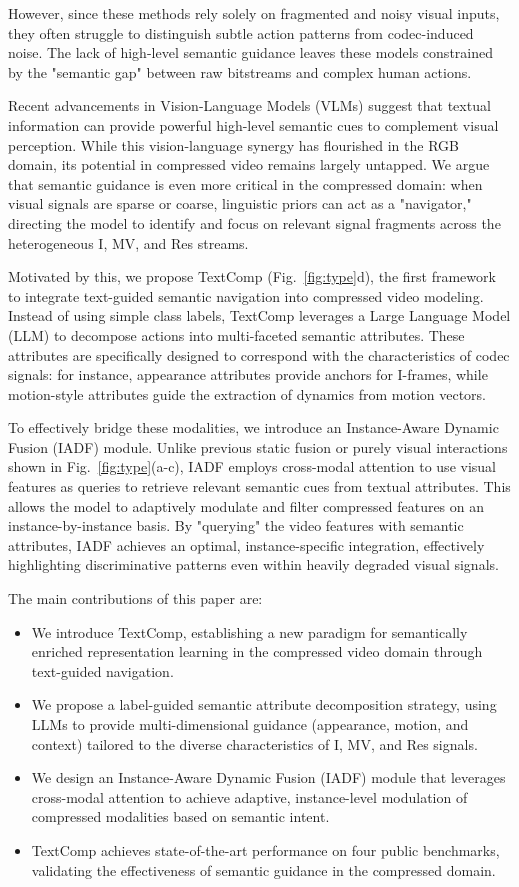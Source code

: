 \documentclass[letterpaper]{article} %
\begin{document}
However, since these methods rely solely on fragmented and noisy visual inputs, they often struggle to distinguish subtle action patterns from codec-induced noise. The lack of high-level semantic guidance leaves these models constrained by the "semantic gap" between raw bitstreams and complex human actions.

Recent advancements in Vision-Language Models (VLMs) suggest that textual information can provide powerful high-level semantic cues to complement visual perception. While this vision-language synergy has flourished in the RGB domain, its potential in compressed video remains largely untapped. We argue that semantic guidance is even more critical in the compressed domain: when visual signals are sparse or coarse, linguistic priors can act as a "navigator," directing the model to identify and focus on relevant signal fragments across the heterogeneous I, MV, and Res streams.

Motivated by this, we propose TextComp (Fig.~\ref{fig:type}d), the first framework to integrate text-guided semantic navigation into compressed video modeling. Instead of using simple class labels, TextComp leverages a Large Language Model (LLM) to decompose actions into multi-faceted semantic attributes. These attributes are specifically designed to correspond with the characteristics of codec signals: for instance, appearance attributes provide anchors for I-frames, while motion-style attributes guide the extraction of dynamics from motion vectors.

To effectively bridge these modalities, we introduce an Instance-Aware Dynamic Fusion (IADF) module. Unlike previous static fusion or purely visual interactions shown in Fig.~\ref{fig:type}(a-c), IADF employs cross-modal attention to use visual features as queries to retrieve relevant semantic cues from textual attributes. This allows the model to adaptively modulate and filter compressed features on an instance-by-instance basis. By "querying" the video features with semantic attributes, IADF achieves an optimal, instance-specific integration, effectively highlighting discriminative patterns even within heavily degraded visual signals.

The main contributions of this paper are:
\begin{itemize}
\item We introduce TextComp, establishing a new paradigm for semantically enriched representation learning in the compressed video domain through text-guided navigation.
\item We propose a label-guided semantic attribute decomposition strategy, using LLMs to provide multi-dimensional guidance (appearance, motion, and context) tailored to the diverse characteristics of I, MV, and Res signals.
\item We design an Instance-Aware Dynamic Fusion (IADF) module that leverages cross-modal attention to achieve adaptive, instance-level modulation of compressed modalities based on semantic intent.
\item TextComp achieves state-of-the-art performance on four public benchmarks, validating the effectiveness of semantic guidance in the compressed domain.
\end{itemize}
\end{document}
